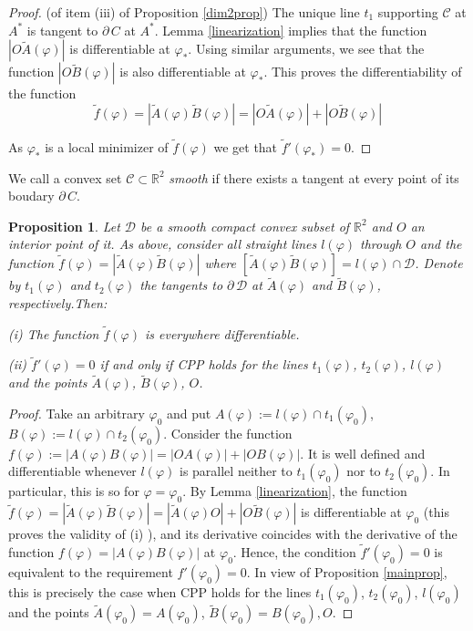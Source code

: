 \documentclass[a4paper,12pt]{amsart}
\newtheorem{prop}[thm]{Proposition}
\begin{document}
\begin{proof} (of item (iii) of Proposition \ref{dim2prop}) The unique line $t_1$  supporting $\mathcal C$ at $A^*$ is tangent to $\partial \, C$ at $A^*$.
Lemma \ref{linearization} implies that  the function $|O \tilde{A}(\varphi)|$ is differentiable at $\varphi_*.$
Using similar arguments, we see that the function $|O \tilde{B}(\varphi)|$ is also differentiable at $\varphi_*$. This proves the differentiability of the function
$$\tilde{f}(\varphi)=|\tilde{A}(\varphi)\tilde{B}(\varphi)| = |O \tilde{A}(\varphi)| +|O \tilde{B}(\varphi)|$$

As $\varphi_*$ is a local minimizer of $\tilde{f}(\varphi)$ we get
that $\tilde{f}'(\varphi_*) = 0.$

\end{proof}

We call a convex set $\mathcal C \subset \mathbb R^2$ {\it smooth} if there exists a
tangent at every point of its
boudary $\partial \, C$.

 \begin{prop} \label{max}
 Let $\mathcal D$ be a smooth compact convex subset of $\mathbb{R}^2$ and $O$ an interior point of it.
 As above, consider all straight lines $l(\varphi)$ through $O$ and the function
 $\tilde{f}(\varphi)=|\tilde{A}(\varphi)\tilde{B}(\varphi)|$ where $[\tilde{A}(\varphi)\tilde{B}(\varphi)]= l(\varphi) \cap \mathcal D$.
 Denote by $t_1(\varphi)$ and $t_2(\varphi)$ the tangents to $\partial \,\mathcal D$ at $\tilde{A}(\varphi)$ and $\tilde{B}(\varphi)$, respectively.Then:

 (i) The function $\tilde{f}(\varphi)$ is everywhere differentiable.

 (ii) $\tilde{f}'(\varphi)=0$ if and only if
  CPP holds for the lines $t_1(\varphi)$, $t_2(\varphi)$, $l(\varphi)$ and the points $\tilde{A}(\varphi)$, $\tilde{B}(\varphi)$, $O$.

\end{prop}

\begin{proof}
Take an arbitrary $\varphi_0$  and put $A(\varphi):= l(\varphi)
\cap t_1(\varphi_0)$, $B(\varphi):= l(\varphi) \cap
t_2(\varphi_0)$. Consider the function
$f(\varphi):=|A(\varphi)B(\varphi)|=|OA(\varphi)| +|OB(\varphi)|$.
It is well defined and differentiable whenever $l(\varphi)$ is
parallel neither to $t_1(\varphi_0)$ nor to $t_2(\varphi_0)$. In
particular, this is so for $\varphi = \varphi_0$. By Lemma
\ref{linearization}, the function
 $\tilde{f}(\varphi) =|\tilde{A}(\varphi)\tilde{B}(\varphi)| = |\tilde{A}(\varphi)
 O| + |O \tilde{B}(\varphi)|$
 is differentiable at $\varphi_0$ (this proves the validity of (i) ), and its derivative coincides with the derivative of the function
 $f(\varphi)=|A(\varphi)B(\varphi)|$ at $\varphi_0$. Hence, the condition $\tilde{f}'(\varphi_0)=0$ is equivalent to the requirement ${f}'(\varphi_0)=0.$
  In view of Proposition \ref{mainprop}, this is precisely the case when CPP holds for the lines $t_1(\varphi_0)$, $t_2(\varphi_0)$, $l(\varphi_0)$
   and the points $\tilde{A}(\varphi_0) = A(\varphi_0)$, $\tilde{B}(\varphi_0)= B(\varphi_0), O$.
\end{proof}
\end{document}
